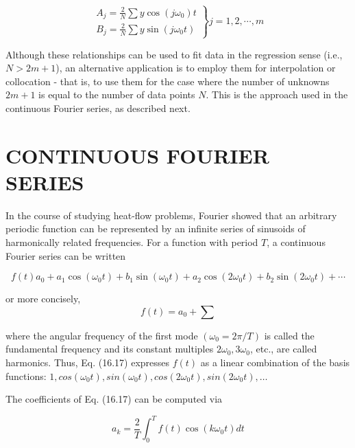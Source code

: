 \documentclass[../main.tex]{subfiles}
\begin{document}
\begin{equation}
	\left.
		\begin{array}{ll}
			A_j = \frac{2}{N} \sum y \cos(j \omega_0) t \\
			B_j = \frac{2}{N} \sum y \sin(j \omega_0 t)
		\end{array}
	\right \} j = 1,2, \dotsb , m
\end{equation}

Although these relationships can be used to fit data in the regression sense (i.e.,$N  > 2 m + 1$), an alternative application is to employ them for interpolation or collocation - that
is, to use them for the case where the number of unknowns $2m + 1$ is equal to the number
of data points $N$. This is the approach used in the continuous Fourier series, as described
next.

\label{cha:cha_P_16_2}
\section{CONTINUOUS FOURIER SERIES}

In the course of studying heat-flow problems, Fourier showed that an arbitrary periodic
function can be represented by an infinite series of sinusoids of harmonically related
frequencies. For a function with period $T$, a continuous Fourier series can be written

\begin{equation}
	f(t) a_0 + a_1 \cos(\omega_0 t) + b_1 \sin(\omega_0 t) +  a_2 \cos(2 \omega_0 t) + b_2 \sin(2 \omega_0 t) + \cdots
\end{equation}

\noindent or more concisely,
\begin{equation}
	\tag{16.17}
	f(t) = a_0 + \sum
\end{equation}

\noindent where the angular frequency of the first mode $(\omega_0 = 2 \pi /T)$ is called the fundamental
frequency and its constant multiples $2 \omega_0, 3 \omega_0$, etc., are called harmonics. Thus, Eq. (16.17)
expresses $f(t)$ as a linear combination of the basis functions: $1, cos( \omega_0 t), sin(\omega_0 t), cos(2 \omega_0 t),
sin(2 \omega_0 t), \dots$

The coefficients of Eq. (16.17) can be computed via

\begin{equation}
	\tag{16.18}
	a_k = \frac{2}{T} \int ^ T _ 0 f(t) \cos (k \omega_0 t) dt
\end{equation}
\end{document}
